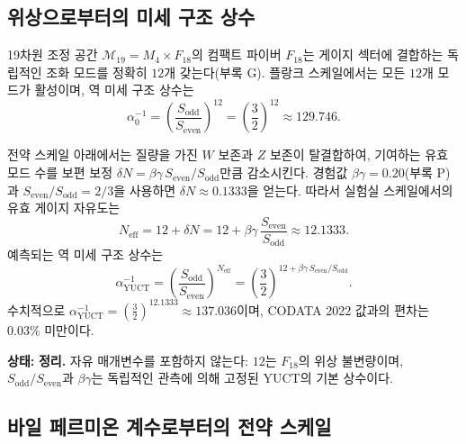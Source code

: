 \documentclass[12pt,a4paper]{article}
\begin{document}
	\subsection{위상으로부터의 미세 구조 상수}
	
	19차원 조정 공간 \(\mathcal{M}_{19}=M_4\times F_{18}\)의 컴팩트 파이버 \(F_{18}\)는 게이지 섹터에 결합하는 독립적인 조화 모드를 정확히 \(12\)개 갖는다(부록 G). 플랑크 스케일에서는 모든 \(12\)개 모드가 활성이며, 역 미세 구조 상수는
	\begin{equation}
		\alpha_0^{-1} = \left(\frac{S_{\mathrm{odd}}}{S_{\mathrm{even}}}\right)^{12}
		= \left(\frac{3}{2}\right)^{12} \approx 129.746 .
	\end{equation}
	
	전약 스케일 아래에서는 질량을 가진 \(W\) 보존과 \(Z\) 보존이 탈결합하여, 기여하는 유효 모드 수를 보편 보정 \(\delta N = \beta\gamma \, S_{\mathrm{even}}/S_{\mathrm{odd}}\)만큼 감소시킨다. 경험값 \(\beta\gamma = 0.20\)(부록 P)과 \(S_{\mathrm{even}}/S_{\mathrm{odd}} = 2/3\)을 사용하면 \(\delta N \approx 0.1333\)을 얻는다. 따라서 실험실 스케일에서의 유효 게이지 자유도는
	\begin{equation}
		N_{\mathrm{eff}} = 12 + \delta N = 12 + \beta\gamma\,\frac{S_{\mathrm{even}}}{S_{\mathrm{odd}}} \approx 12.1333 .
	\end{equation}
	예측되는 역 미세 구조 상수는
	\begin{equation}
		\boxed{\alpha^{-1}_{\mathrm{YUCT}} =
			\left(\frac{S_{\mathrm{odd}}}{S_{\mathrm{even}}}\right)^{N_{\mathrm{eff}}}
			= \left(\frac{3}{2}\right)^{12 + \beta\gamma\,S_{\mathrm{even}}/S_{\mathrm{odd}}} } .
		\label{eq:alpha-yuct}
	\end{equation}
	수치적으로 \(\alpha^{-1}_{\mathrm{YUCT}} = \left(\frac{3}{2}\right)^{12.1333} \approx 137.036\)이며, CODATA 2022 값과의 편차는 \(0.03\%\) 미만이다.
	
	\textbf{상태:} \textbf{정리.} 자유 매개변수를 포함하지 않는다: \(12\)는 \(F_{18}\)의 위상 불변량이며, \(S_{\mathrm{odd}}/S_{\mathrm{even}}\)과 \(\beta\gamma\)는 독립적인 관측에 의해 고정된 YUCT의 기본 상수이다.
	
	\subsection{바일 페르미온 계수로부터의 전약 스케일}
	
\end{document}
